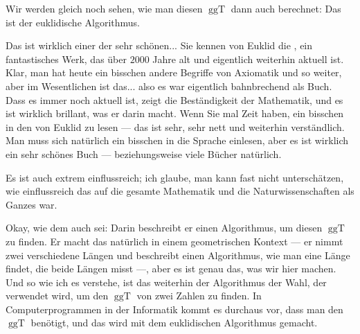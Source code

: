 \begin{spoken-clean}[00:28:27 - 00:30:44]
Wir werden gleich noch sehen, wie man diesen $\operatorname{ggT}$ dann auch berechnet: Das ist der euklidische Algorithmus.

Das ist wirklich einer der sehr schönen... Sie kennen von Euklid die , ein fantastisches Werk, das über $2000$ Jahre alt und eigentlich weiterhin aktuell ist. Klar, man hat heute ein bisschen andere Begriffe von Axiomatik und so weiter, aber im Wesentlichen ist das... also es war eigentlich bahnbrechend als Buch. Dass es immer noch aktuell ist, zeigt die Beständigkeit der Mathematik, und es ist wirklich brillant, was er darin macht. Wenn Sie mal Zeit haben, ein bisschen in den  von Euklid zu lesen --- das ist sehr, sehr nett und weiterhin verständlich. Man muss sich natürlich ein bisschen in die Sprache einlesen, aber es ist wirklich ein sehr schönes Buch --- beziehungsweise viele Bücher natürlich.

Es ist auch extrem einflussreich; ich glaube, man kann fast nicht unterschätzen, wie einflussreich das auf die gesamte Mathematik und die Naturwissenschaften als Ganzes war.

Okay, wie dem auch sei: Darin beschreibt er einen Algorithmus, um diesen $\operatorname{ggT}$ zu finden. Er macht das natürlich in einem geometrischen Kontext --- er nimmt zwei verschiedene Längen und beschreibt einen Algorithmus, wie man eine Länge findet, die beide Längen misst ---, aber es ist genau das, was wir hier machen. Und so wie ich es verstehe, ist das weiterhin der Algorithmus der Wahl, der verwendet wird, um den $\operatorname{ggT}$ von zwei Zahlen zu finden. In Computerprogrammen in der Informatik kommt es durchaus vor, dass man den $\operatorname{ggT}$ benötigt, und das wird mit dem euklidischen Algorithmus gemacht.
\end{spoken-clean}

